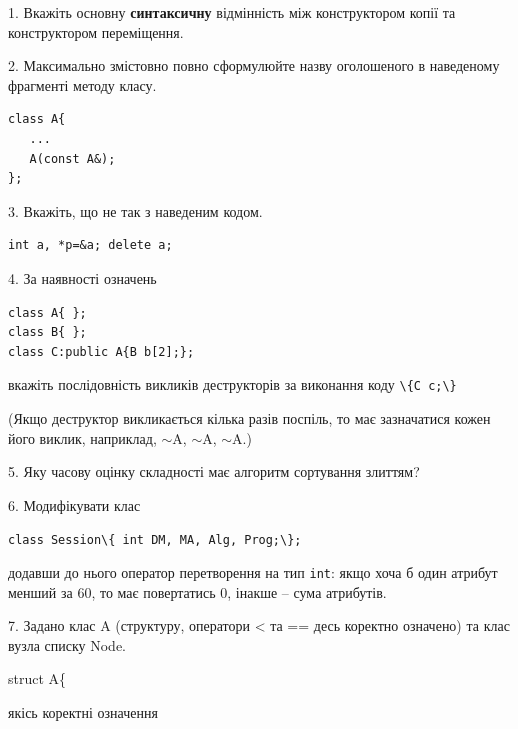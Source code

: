 \documentclass[12pt, ukrainian]{article}
\def\code#1{\Verb!#1!}
\begin{document}
{%
1. Вкажіть основну \textbf{синтаксичну} відмінність між конструктором копії та конструктором переміщення.%
\par
\vspace{2mm}
2. Максимально змістовно повно сформулюйте назву оголошеного в наведеному фрагменті методу класу.
\vspace{-3mm}
\begin{verbatim}class A{
   ...
   A(const A&);
};\end{verbatim}
\vspace{-3mm}
\par
\vspace{2mm}
3. Вкажіть, що не так з наведеним кодом.
\vspace{-3mm}
\begin{verbatim}int a, *p=&a; delete a;\end{verbatim}
\vspace{-3mm}
\par
\vspace{2mm}
4. За наявності означень
\vspace{-3mm}
\begin{verbatim}
class A{ };
class B{ };
class C:public A{B b[2];};\end{verbatim}
\vspace{-3mm}
вкажіть послідовність викликів деструкторів за виконання коду \code{\{C c;\}} 

(Якщо деструктор викликається кілька разів поспіль, то має зазначатися кожен його виклик, наприклад, $\sim$A, $\sim$A, $\sim$A.)

\vspace{2mm}
5. Яку часову оцінку складності має алгоритм сортування злиттям?
\par
\vspace{2mm}
6. Модифікувати клас 

\qquad\code{class Session\{ int DM, MA, Alg, Prog;\};} 


додавши до нього оператор перетворення на тип \code{int}: якщо хоча б один атрибут менший за 60, то має повертатись 0, інакше -- сума атрибутів.%
\par
\vspace{2mm}
7. 
Задано клас A (структуру, оператори < та == десь коректно означено) та клас вузла списку Node.

struct A\{

\quad  якісь коректні означення 

}
\end{document}
